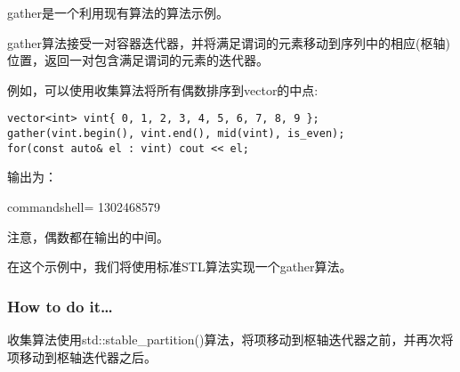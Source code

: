 
gather是一个利用现有算法的算法示例。

gather算法接受一对容器迭代器，并将满足谓词的元素移动到序列中的相应(枢轴)位置，返回一对包含满足谓词的元素的迭代器。

例如，可以使用收集算法将所有偶数排序到vector的中点:

\begin{lstlisting}[style=styleCXX]
vector<int> vint{ 0, 1, 2, 3, 4, 5, 6, 7, 8, 9 };
gather(vint.begin(), vint.end(), mid(vint), is_even);
for(const auto& el : vint) cout << el;
\end{lstlisting}

输出为：

\begin{tcblisting}{commandshell={}}
1302468579
\end{tcblisting}

注意，偶数都在输出的中间。

在这个示例中，我们将使用标准STL算法实现一个gather算法。

\subsubsection{How to do it…}

收集算法使用std::stable\_partition()算法，将项移动到枢轴迭代器之前，并再次将项移动到枢轴迭代器之后。

